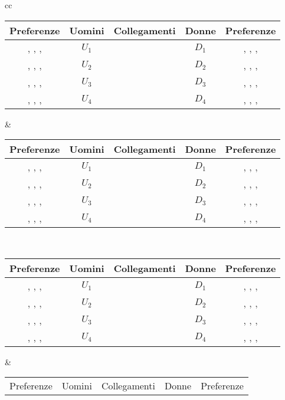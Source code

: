 \documentclass{article}
\theoremstyle{definition}
\theoremstyle{remark}
\begin{document}
\begin{center}
    \begin{tabular}{cc}
        \begin{tabular}{|c|c|p{2cm}|c|c|}
            \hline
            Preferenze & Uomini& Collegamenti &Donne & Preferenze\\
            \hline
            {  ,  ,  ,}&\(U_1\) &&\(D_1\) & {  ,  ,  ,}\\
            \hline
            {  ,  ,  ,}&\(U_2\) &&\(D_2\) & {  ,  ,  ,}\\
            \hline
            {  ,  ,  ,}&\(U_3\) &&\(D_3\) & {  ,  ,  ,}\\
            \hline
            {  ,  ,  ,}&\(U_4\) &&\(D_4\) & {  ,  ,  ,}\\
            \hline
          \end{tabular} &
          \begin{tabular}{|c|c|p{2cm}|c|c|}
            \hline
            Preferenze & Uomini&Collegamenti &Donne & Preferenze\\
            \hline
            {  ,  ,  ,}&\(U_1\) &&\(D_1\) & {  ,  ,  ,}\\
            \hline
            {  ,  ,  ,}&\(U_2\) &&\(D_2\) & {  ,  ,  ,}\\
            \hline
            {  ,  ,  ,}&\(U_3\) &&\(D_3\) & {  ,  ,  ,}\\
            \hline
            {  ,  ,  ,}&\(U_4\) &&\(D_4\) & {  ,  ,  ,}\\
            \hline
          \end{tabular}\\
          \begin{tabular}{|c|c|p{2cm}|c|c|}
            \hline
            Preferenze & Uomini&Collegamenti &Donne & Preferenze\\
            \hline
            {  ,  ,  ,}&\(U_1\) &&\(D_1\) & {  ,  ,  ,}\\
            \hline
            {  ,  ,  ,}&\(U_2\) &&\(D_2\) & {  ,  ,  ,}\\
            \hline
            {  ,  ,  ,}&\(U_3\) &&\(D_3\) & {  ,  ,  ,}\\
            \hline
            {  ,  ,  ,}&\(U_4\) &&\(D_4\) & {  ,  ,  ,}\\
            \hline
          \end{tabular} &
          \begin{tabular}{|c|c|p{2cm}|c|c|}
            \hline
            Preferenze & Uomini&Collegamenti &Donne & Preferenze\\

\end{tabular}
\end{tabular}
\end{center}
\end{document}
